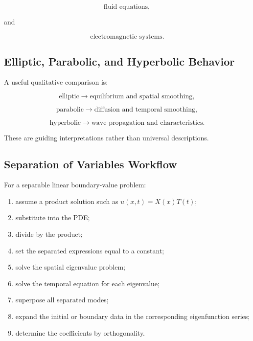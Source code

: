 \[
\boxed{
\text{fluid equations},
}
\]

and

\[
\boxed{
\text{electromagnetic systems}.
}
\]

\subsection{Elliptic, Parabolic, and Hyperbolic Behavior}
\label{subsec:pde-type-comparison}

A useful qualitative comparison is:

\[
\boxed{
\text{elliptic}
\rightarrow
\text{equilibrium and spatial smoothing},
}
\]

\[
\boxed{
\text{parabolic}
\rightarrow
\text{diffusion and temporal smoothing},
}
\]

\[
\boxed{
\text{hyperbolic}
\rightarrow
\text{wave propagation and characteristics}.
}
\]

These are guiding interpretations rather than universal descriptions.

\subsection{Separation of Variables Workflow}
\label{subsec:pde-separation-workflow}

For a separable linear boundary-value problem:

\begin{enumerate}
    \item assume a product solution such as
          \(u(x,t)=X(x)T(t)\);
    \item substitute into the PDE;
    \item divide by the product;
    \item set the separated expressions equal to a constant;
    \item solve the spatial eigenvalue problem;
    \item solve the temporal equation for each eigenvalue;
    \item superpose all separated modes;
    \item expand the initial or boundary data in the corresponding
          eigenfunction series;
    \item determine the coefficients by orthogonality.
\end{enumerate}

